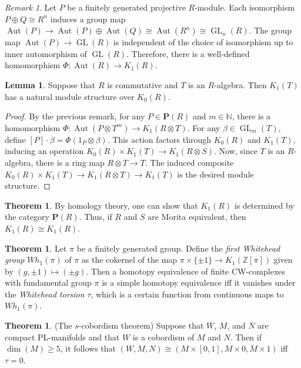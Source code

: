 \documentclass[10pt,letterpaper,cm]{nupset}
\theoremstyle{definition}
\theoremstyle{theorem}
\newtheorem{theorem}[definition]{Theorem}
\newtheorem{lemma}[definition]{Lemma}
\theoremstyle{remark}
\newtheorem{remark}[definition]{Remark}
\newcommand{\N}{\mathbb N}
\renewcommand{\P}{\mathbf P}
\newcommand{\Z}{\mathbb Z}
\newcommand{\1}{\mathbf{1}}
\newcommand{\0}{\vec 0}
\DeclareMathOperator*{\GL}{GL}
\DeclareMathOperator{\aut}{Aut}
\begin{document}
\begin{remark}
Let $P$ be a finitely generated projective $R$-module. Each isomorphism $P \oplus Q \cong R^n$ induces a group map $\aut(P) \to \aut(P) \oplus \aut(Q) \cong \aut(R^n) \cong \GL_n(R)$. The group map $\aut(P) \to \GL(R)$ is independent of the choice of isomorphism up to inner automorphism of $\GL(R)$. Therefore, there is a well-defined homomorphism $\Phi: \aut(R) \to K_1(R)$.
\end{remark}

\begin{lemma}
Suppose that $R$ is commutative and $T$ is an $R$-algebra. Then $K_1(T)$ has a natural module structure over $K_0(R)$.
\end{lemma}
\begin{proof}
By the previous remark, for any $P \in \P(R)$ and $m\in \N$, there is a homomorphism $\Phi : \aut(P \otimes T^m) \to K_1(R\otimes T).$ For any $\beta \in \GL_m(T)$, define $[P] \cdot \beta = \Phi(1_P \otimes \beta)$. This action factors through $K_0(R)$ and $K_1(T)$, inducing an operation $K_0(R) \times K_1(T) \to K_1(R \otimes S)$. Now, since $T$ is an $R$-algebra, there is a ring map $R\otimes T \to T$. The induced composite $K_0(R) \times K_1(T) \to K_1(R \otimes T) \to K_1(T)$ is the desired module structure.
\end{proof}

\begin{theorem}
By homology theory, one can show that $K_1(R)$ is determined by the category $\P(R)$. Thus, if $R$ and $S$ are Morita equivalent, then $K_1(R) \cong K_1(R)$. 
\end{theorem}

\begin{theorem}
Let $\pi$ be a finitely generated group. Define the \textit{first Whitehead group} $Wh_1(\pi)$ of $\pi$ as the cokernel of the map $\pi \times \{\pm 1\}\to K_1(\Z[\pi])$ given by $(g, \pm 1)\mapsto (\pm g)$. Then a homotopy equivalence of finite CW-complexes with fundamental group $\pi$ is a simple homotopy equivalence iff it vanishes under the \textit{Whitehead torsion} $\tau$, which is a certain function from continuous maps to $Wh_1(\pi)$.
\end{theorem}

\begin{theorem}{(The $s$-cobordism theorem)}
Suppose that $W$, $M$, and $N$ are compact PL-manifolds and that $W$ is a cobordism of $M$ and $N$. Then if $\dim(M) \geq 5$, it follows that $(W, M, N) \cong (M \times [0, 1], M \times 0, M \times 1)$ iff $\tau= 0$.
\end{theorem}
\end{document}
